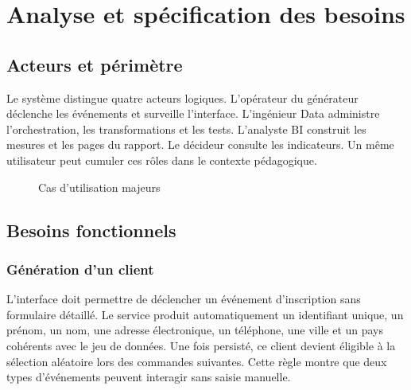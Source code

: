 \chapter{Analyse et spécification des besoins}

\section{Acteurs et périmètre}
Le système distingue quatre acteurs logiques. L'opérateur du générateur déclenche les événements et surveille l'interface. L'ingénieur Data administre l'orchestration, les transformations et les tests. L'analyste BI construit les mesures et les pages du rapport. Le décideur consulte les indicateurs. Un même utilisateur peut cumuler ces rôles dans le contexte pédagogique.

\begin{figure}[htbp]
\centering
{}
\caption{Cas d'utilisation majeurs}
\label{fig:usecases}
\end{figure}

\section{Besoins fonctionnels}
\subsection{Génération d'un client}
L'interface doit permettre de déclencher un événement d'inscription sans formulaire détaillé. Le service produit automatiquement un identifiant unique, un prénom, un nom, une adresse électronique, un téléphone, une ville et un pays cohérents avec le jeu de données. Une fois persisté, ce client devient éligible à la sélection aléatoire lors des commandes suivantes. Cette règle montre que deux types d'événements peuvent interagir sans saisie manuelle.

